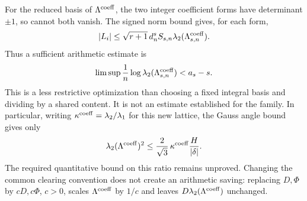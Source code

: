\documentclass[11pt]{article}
\theoremstyle{remark}
\begin{document}
For the reduced basis of \(\Lambda^{\rm coeff}\), the two integer
coefficient forms have determinant \(\pm1\), so cannot both vanish.
The signed norm bound gives, for each form,
\begin{equation}
 |L_i|\le\sqrt{r+1}\,d_n^s S_{s,n}
                    \lambda_2(\Lambda^{\rm coeff}_{s,n}).
 \label{eq:optimal-pair-bound}
\end{equation}
Thus a sufficient arithmetic estimate is
\begin{equation}
 \limsup\frac1n\log\lambda_2(\Lambda^{\rm coeff}_{s,n})<a_s-s.
 \label{eq:coefficient-rate}
\end{equation}
This is a less restrictive optimization than choosing a fixed integral
basis and dividing by a shared content. It is not an estimate established
for the family. In particular, writing
\(\kappa^{\rm coeff}=\lambda_2/\lambda_1\) for this new lattice,
the Gauss angle bound gives only
\[
 \lambda_2(\Lambda^{\rm coeff})^2
       \le\frac2{\sqrt3}\,\kappa^{\rm coeff}\frac H{|\delta|}.
\]
The required quantitative bound on this ratio remains unproved.
Changing the common clearing convention does not create an arithmetic
saving: replacing \(D,\Phi\) by \(cD,c\Phi\), \(c>0\), scales
\(\Lambda^{\rm coeff}\) by \(1/c\) and leaves
\(D\lambda_2(\Lambda^{\rm coeff})\) unchanged.
\end{document}
